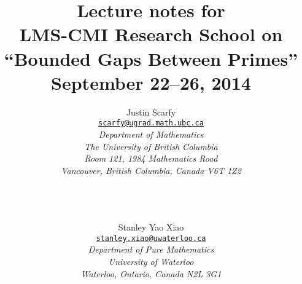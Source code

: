 \documentclass[12pt,amsfont]{amsart}
\begin{document}
\newtheorem{theorem}{Theorem}[section]
\newtheorem{lem}[theorem]{Lemma}
\newtheorem{pbm}[theorem]{Problem}
\newtheorem{pro}[theorem]{Proposition}
\newtheorem{cor}[theorem]{Corollary}
\newtheorem{cnj}[theorem]{Conjecture}
\newtheorem{dfn}[theorem]{Definition}
\newtheorem{thm}[theorem]{Theorem}
\newtheorem{rmk}[theorem]{Remark}
\newtheorem{xmp}[theorem]{Example}
\newtheorem{exe}[theorem]{Exercise}
\newenvironment{solution}
               {\let\oldqedsymbol=\qedsymbol
                \renewcommand{\qedsymbol}{$\blacktriangle$}
                \begin{proof}[\bf Solution]} 
               {\end{proof}
                \renewcommand{\qedsymbol}{\oldqedsymbol}}
\title{\bf Lecture notes for\\LMS-CMI Research School on  \\``Bounded Gaps Between Primes''\\ September 22--26, 2014}
\author{Justin Scarfy\\
\href{mailto:scarfy@ugrad.math.ubc.ca}{
{\texttt{\lowercase{scarfy@ugrad.math.ubc.ca}}} }
\\
{\textnormal{\textit{D{\lowercase{epartment of }}M{\lowercase{athematics}}\\ T\lowercase{he} U\lowercase{niversity of} B\lowercase{ritish} C\lowercase{olumbia}\\ R\lowercase{oom} 121, 1984 M\lowercase{athematics} R\lowercase{oad}\\V\lowercase{ancouver}, B\lowercase{ritish} C\lowercase{olumbia}, C\lowercase{anada} V6T 1Z2}}}\\ \\ \and \\ \\Stanley Yao Xiao \\ \href{mailto:stanley.xiao@uwaterloo.ca}{
{\texttt{\lowercase{stanley.xiao@uwaterloo.ca}}} }\\ {\textnormal{\textit{D{\lowercase{epartment of }}P{\lowercase{ure}} M{\lowercase{athematics}}\\
U{\lowercase{niversity of }}W{\lowercase{aterloo}}\\
W{\lowercase{aterloo}}, O{\lowercase{ntario}}, C{\lowercase{anada}}
N2L 3G1}}}}
\begin{abstract}

\end{abstract}
\maketitle
\setcounter{tocdepth}{1}
\tableofcontents
\end{document}
